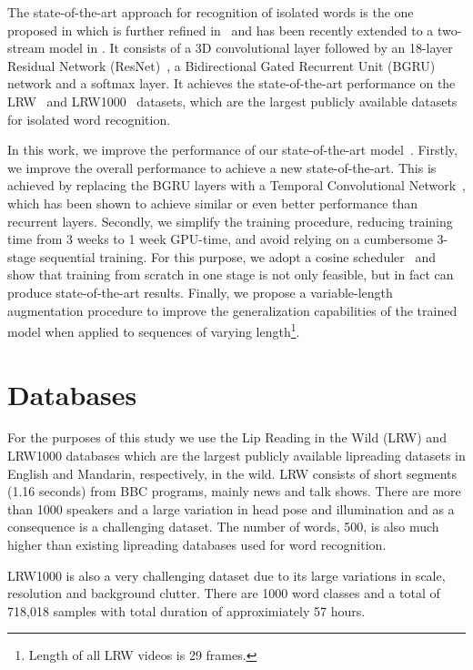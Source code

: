 \documentclass{article}
\begin{document}
The state-of-the-art approach for recognition of isolated words is the one proposed in \cite{stafylakis17} which is further refined in~\cite{petridis18} and has been recently extended to a two-stream model in \cite{weng19}. It consists of a 3D convolutional layer followed by an 18-layer Residual Network (ResNet)~\cite{He_2016_CVPR}, a Bidirectional Gated Recurrent Unit (BGRU) network and a softmax layer. It achieves the state-of-the-art performance on the LRW~\cite{chung16b} and LRW1000~\cite{lrw1000} datasets, which are the largest publicly available datasets for isolated word recognition.

In this work, we improve the performance of our state-of-the-art model~\cite{petridis18}. Firstly, we improve the overall performance to achieve a new state-of-the-art. This is achieved by replacing the BGRU layers with a Temporal Convolutional Network~\cite{BaiTCN2018}, which has been shown to achieve similar or even better performance than recurrent layers. Secondly, we simplify the training procedure, reducing training time from 3 weeks to 1 week GPU-time, and avoid relying on a cumbersome 3-stage sequential training. For this purpose, we adopt a cosine scheduler~\cite{sgdr17} and show that training from scratch in one stage is not only feasible, but in fact can produce state-of-the-art results. Finally, we propose a variable-length augmentation procedure to improve the generalization capabilities of the trained model when applied to sequences of varying length\footnote{Length of all LRW videos is 29 frames.}.  


\section{Databases}

For the purposes of this study we use the Lip Reading in the
Wild (LRW) \cite{chung16} and LRW1000 \cite{lrw1000} databases which are the largest publicly available lipreading datasets in English and Mandarin, respectively, in the wild. LRW consists of short segments (1.16 seconds) from BBC programs, mainly news and talk shows. There are more than 1000 speakers and a large variation in head pose and illumination and as a consequence is a challenging dataset. The number of words, 500, is also much higher than existing lipreading databases used for word recognition.

 LRW1000 is also a very challenging  dataset due to its large variations in scale, resolution and background clutter. There are 1000 word classes and a total of 718,018 samples with total duration of approximiately 57 hours.
\end{document}
